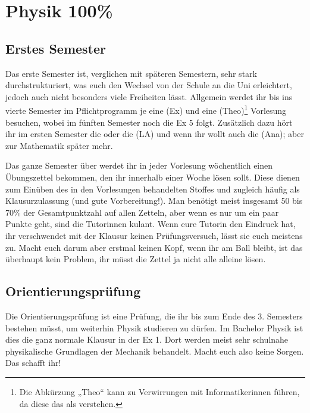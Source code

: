 \section{Physik 100\%}

\subsection{Erstes Semester}
Das erste Semester ist, verglichen mit späteren Semestern, sehr stark durchstrukturiert, was euch den Wechsel von der Schule an die Uni erleichtert, jedoch auch nicht besonders viele Freiheiten lässt.  Allgemein werdet ihr bis ins vierte Semester im Pflichtprogramm je eine  (\gls{Ex}) und eine  (\gls{Theo})\footnote{Die Abkürzung „Theo“ kann zu Verwirrungen mit Informatikerinnen führen, da diese das als  verstehen.} Vorlesung besuchen, wobei im fünften Semester noch die \gls{Ex} 5 folgt. Zusätzlich dazu hört ihr im ersten Semester die  oder die  (\gls{LA}) und wenn ihr wollt auch die  (\gls{Ana}); aber zur Mathematik später mehr.

Das ganze Semester über werdet ihr in jeder Vorlesung wöchentlich einen Übungszettel bekommen, den ihr innerhalb einer Woche lösen sollt. Diese dienen zum Einüben des in den Vorlesungen behandelten Stoffes und zugleich häufig als Klausurzulassung (und gute Vorbereitung!). Man benötigt meist insgesamt 50 bis 70\% der Gesamtpunktzahl auf allen Zetteln, aber wenn es nur um ein paar Punkte geht, sind die Tutorinnen kulant. Wenn eure Tutorin den Eindruck hat, ihr verschwendet mit der Klausur keinen Prüfungsversuch, lässt sie euch meistens zu. Macht euch darum aber erstmal keinen Kopf, wenn ihr am Ball bleibt, ist das überhaupt kein Problem, ihr müsst die Zettel ja nicht alle alleine lösen.

\subsection{Orientierungsprüfung}
Die Orientierungsprüfung ist eine Prüfung, die ihr bis zum Ende des 3. Semesters bestehen müsst, um weiterhin Physik studieren zu dürfen. Im Bachelor Physik ist dies die ganz normale Klausur in der \gls{Ex} 1. Dort werden meist sehr schulnahe physikalische Grundlagen der Mechanik behandelt. Macht euch also keine Sorgen. Das schafft ihr!

